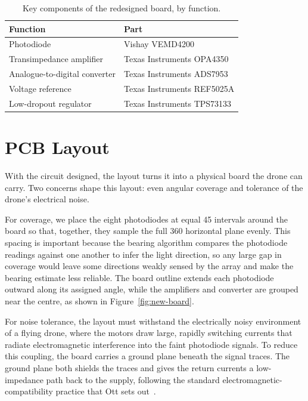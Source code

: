 \begin{table}[h]
    \centering
    \caption{Key components of the redesigned board, by function.}
    \label{tab:components}
    \begin{tabular}{ll}
        \hline
        Function & Part \\
        \hline
        Photodiode & Vishay VEMD4200 \\
        Transimpedance amplifier & Texas Instruments OPA4350 \\
        Analogue-to-digital converter & Texas Instruments ADS7953 \\
        Voltage reference & Texas Instruments REF5025A \\
        Low-dropout regulator & Texas Instruments TPS73133 \\
        \hline
    \end{tabular}
\end{table}

\section{PCB Layout}
\label{sec:pcb-layout}

With the circuit designed, the layout turns it into a physical board the drone can carry. Two concerns shape this layout: even angular coverage and tolerance of the drone's electrical noise.

For coverage, we place the eight photodiodes at equal 45\textdegree{} intervals around the board so that, together, they sample the full 360\textdegree{} horizontal plane evenly. This spacing is important because the bearing algorithm compares the photodiode readings against one another to infer the light direction, so any large gap in coverage would leave some directions weakly sensed by the array and make the bearing estimate less reliable. The board outline extends each photodiode outward along its assigned angle, while the amplifiers and converter are grouped near the centre, as shown in Figure~\ref{fig:new-board}.

For noise tolerance, the layout must withstand the electrically noisy environment of a flying drone, where the motors draw large, rapidly switching currents that radiate electromagnetic interference into the faint photodiode signals. To reduce this coupling, the board carries a ground plane beneath the signal traces. The ground plane both shields the traces and gives the return currents a low-impedance path back to the supply, following the standard electromagnetic-compatibility practice that Ott sets out~\cite{ott2009emc}.


